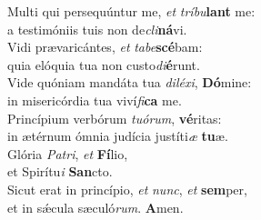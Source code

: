 \oddverse Multi qui persequúntur me, \textit{et} \textit{trí}\textit{bu}\textbf{lant} me:~\*\\
\oddverse a testimóniis tuis non de\textit{cli}\textbf{ná}vi.\\
\evenverse Vidi prævaricántes, \textit{et} \textit{ta}\textit{be}\textbf{scé}bam:~\*\\
\evenverse quia elóquia tua non custo\textit{di}\textbf{é}runt.\\
\oddverse Vide quóniam mandáta tua \textit{di}\textit{lé}\textit{xi}, \textbf{Dó}mine:~\*\\
\oddverse in misericórdia tua viví\textit{fi}\textbf{ca} me.\\
\evenverse Princípium verbórum \textit{tu}\textit{ó}\textit{rum}, \textbf{vé}ritas:~\*\\
\evenverse in ætérnum ómnia judícia justíti\textit{æ} \textbf{tu}æ.\\
\oddverse Glória \textit{Pa}\textit{tri}, \textit{et} \textbf{Fí}lio,~\*\\
\oddverse et Spirítu\textit{i} \textbf{San}cto.\\
\evenverse Sicut erat in princípio, \textit{et} \textit{nunc}, \textit{et} \textbf{sem}per,~\*\\
\evenverse et in sǽcula sæculó\textit{rum}. \textbf{A}men.\\
